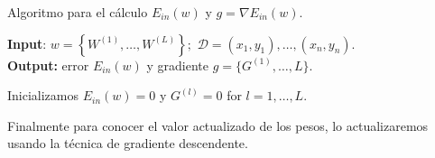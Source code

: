 \begin{algorithm}[H]
    \caption{Algoritmo para el cálculo $E_{in}(w)$
    y $g = \nabla E_{in}(w).$}
    \hspace*{\algorithmicindent} \textbf{Input}:
    $w = \left\{ W^{(1)}, \ldots, W^{(L)}\right\};$
    $\mathcal{D} = (x_1, y_1), \ldots, (x_n, y_n).$\\
    \hspace*{\algorithmicindent} \textbf{Output:} error $E_{in}(w)$ y gradiente
    $g = \{G^{(1)}, \ldots, L\}.$  
    \begin{algorithmic}[1]
        \STATE Inicializamos $E_{in}(w)=0$ y $G^{(l)} = 0$ 
        for $l = 1, \ldots, L.$
        \STATE {}
\end{algorithmic}
\end{algorithm}

Finalmente para conocer el valor actualizado de los pesos, lo actualizaremos usando la técnica de gradiente descendente. 

